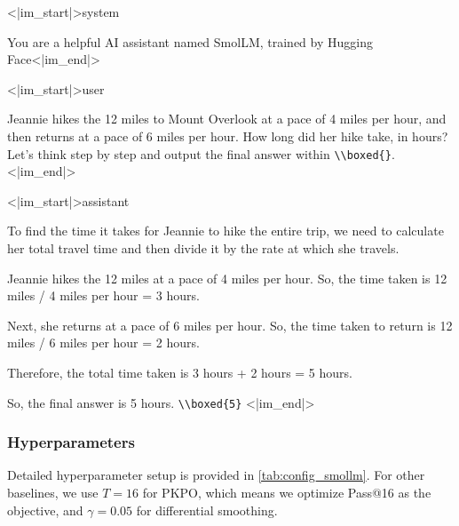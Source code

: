 \documentclass[10pt]{article} %
\begin{document}
\begin{tcolorbox}[
    colback=cyan!5,       
    colframe=cyan!50!blue, 
    coltext=black,
    coltitle=white,
  title={SmolLM2-360M-Instruct},
  fonttitle=\small\bfseries,
  boxrule=0.4pt,
  arc=2mm,
  left=10pt,
  right=10pt,
  top=4pt,
  bottom=4pt
]
\label{box:gsm8k}

{\ttfamily\small
<|im\_start|>system
}

{\ttfamily\small
You are a helpful AI assistant named SmolLM, trained by Hugging Face<|im\_end|>
}

{\ttfamily\small
<|im\_start|>user
}

{\ttfamily\small
Jeannie hikes the 12 miles to Mount Overlook at a pace of 4 miles per hour, and then returns at a pace of 6 miles per hour. How long did her hike take, in hours? Let's think step by step and output the final answer within \texttt{\textbackslash \textbackslash boxed\{\}}. <|im\_end|>
}

{\ttfamily\small
<|im\_start|>assistant
}

{\ttfamily\small
To find the time it takes for Jeannie to hike the entire trip, we need to calculate her total travel time and then divide it by the rate at which she travels.
}

{\ttfamily\small
Jeannie hikes the 12 miles at a pace of 4 miles per hour. So, the time taken is 12 miles / 4 miles per hour = 3 hours.
}

{\ttfamily\small
Next, she returns at a pace of 6 miles per hour. So, the time taken to return is 12 miles / 6 miles per hour = 2 hours.
}

{\ttfamily\small
Therefore, the total time taken is 3 hours + 2 hours = 5 hours.
}

{\ttfamily\small
So, the final answer is 5 hours. \texttt{\textbackslash \textbackslash boxed\{5\}} <|im\_end|>
}

\end{tcolorbox}


\subsubsection{Hyperparameters}
Detailed hyperparameter setup is provided in \cref{tab:config_smollm}. For other baselines, we use $T=16$ for PKPO, which means we optimize Pass@16 as the objective, and $\gamma=0.05$ for differential smoothing.
\end{document}
